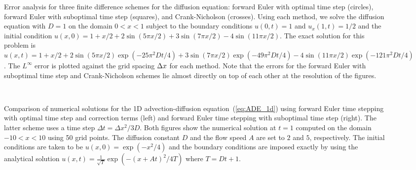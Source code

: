 \documentclass[oneeqnum,onefignum,onetabnum,onethmnum]{siamltex}
\begin{document}
\begin{figure}[htb]
\begin{center}
\caption{Error analysis for three finite difference schemes for the 
diffusion equation: forward Euler with optimal time step (circles), forward 
Euler with suboptimal time step (squares), and Crank-Nicholson (crosses).  
Using each method, we solve the diffusion equation with $D = 1$ on the 
domain $0 < x < 1$ subject to the boundary conditions 
$u(0,t) = 1$ and $u_x(1,t) = 1/2$ 
and the initial condition
$u(x,0) = 1 + x/2 + 2 \sin(5 \pi x/2) + 3 \sin(7 \pi x/2) 
- 4 \sin(11 \pi x/2)$.  
The exact solution for this problem is
$u(x,t) = 1 + x/2 
        + 2 \sin(5 \pi x/2)  \exp(-25 \pi^2 D t/4) 
        + 3 \sin(7 \pi x/2)  \exp(-49 \pi^2 D t/4)
        - 4 \sin(11 \pi x/2) \exp(-121 \pi^2 D t/4)$.
The $L^\infty$ error is plotted against the grid spacing $\Delta x$ for each 
method.  Note that the errors for the forward Euler with suboptimal time 
step and Crank-Nicholson schemes lie almost directly on top of each other
at the resolution of the figures.
}
\label{fig:ADE_1d_error}
\end{center}
\end{figure}

\begin{figure}[htb]
\begin{center}
\ \ \ \ \
\caption{Comparison of numerical solutions for the 1D advection-diffusion
equation~(\ref{eq:ADE_1d}) using forward Euler time stepping with 
optimal time step and correction terms (left) and forward Euler time 
stepping with suboptimal time step (right).  The latter scheme uses a 
time step $\Delta t = \Delta x^2 / 3 D$.  Both figures show the numerical
solution at $t = 1$ computed on the domain $-10 < x < 10$ using 50 grid points.
The diffusion constant $D$ and the flow speed $A$ are set to $2$ and $5$,
respectively.
The initial conditions are taken to be $u(x,0) = \exp \left( -x^2/4 \right)$
and the boundary conditions are imposed exactly by using the analytical 
solution $u(x,t) = \frac{1}{\sqrt{T}} \exp \left( -(x+At)^2/4T \right)$
where $T = Dt+1$.
}
\label{fig:burgers_1d_solns}
\end{center}
\end{figure}
\end{document}
